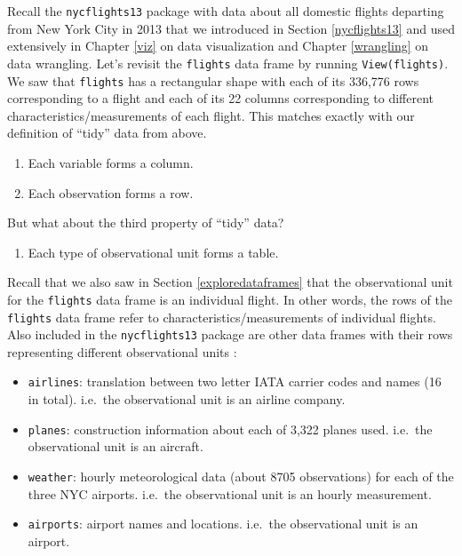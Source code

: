 \documentclass[12pt, krantz2,]{krantz}
\providecommand{\tightlist}{%
  \setlength{\itemsep}{0pt}\setlength{\parskip}{0pt}}
\renewenvironment{quote}{\begin{VF}}{\end{VF}}
\begin{document}
Recall the \texttt{nycflights13} package with data about all domestic flights departing from New York City in 2013 that we introduced in Section \ref{nycflights13} and used extensively in Chapter \ref{viz} on data visualization and Chapter \ref{wrangling} on data wrangling. Let's revisit the \texttt{flights} data frame by running \texttt{View(flights)}. We saw that \texttt{flights} has a rectangular shape with each of its 336,776 rows corresponding to a flight and each of its 22 columns corresponding to different characteristics/measurements of each flight. This matches exactly with our definition of ``tidy'' data from above.

\begin{enumerate}
\def\labelenumi{\arabic{enumi}.}
\tightlist
\item
  Each variable forms a column.
\item
  Each observation forms a row.
\end{enumerate}

But what about the third property of ``tidy'' data?

\begin{quote}
\begin{enumerate}
\def\labelenumi{\arabic{enumi}.}
\setcounter{enumi}{2}
\tightlist
\item
  Each type of observational unit forms a table.
\end{enumerate}
\end{quote}

Recall that we also saw in Section \ref{exploredataframes} that the observational unit for the \texttt{flights} data frame is an individual flight. In other words, the rows of the \texttt{flights} data frame refer to characteristics/measurements of individual flights. Also included in the \texttt{nycflights13} package are other data frames with their rows representing different observational units \citep{R-nycflights13}:

\begin{itemize}
\tightlist
\item
  \texttt{airlines}: translation between two letter IATA carrier codes and names (16 in total). i.e.~the observational unit is an airline company.
\item
  \texttt{planes}: construction information about each of 3,322 planes used. i.e.~the observational unit is an aircraft.
\item
  \texttt{weather}: hourly meteorological data (about 8705 observations) for each of the three NYC airports. i.e.~the observational unit is an hourly measurement.
\item
  \texttt{airports}: airport names and locations. i.e.~the observational unit is an airport.
\end{itemize}
\end{document}
